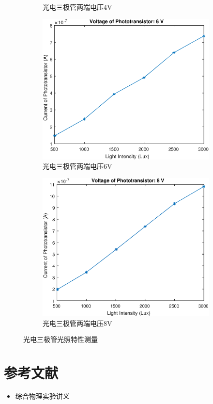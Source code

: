\documentclass{ctexart}
\begin{document}
\begin{figure}[H]
\begin{subfigure}{.45\textwidth}
    \caption{光电三极管两端电压4V}
  \end{subfigure}
  \begin{subfigure}{.45\textwidth}
    \centering
    \includegraphics[width=\linewidth]{光电传感器综合实验图像/phototransistor_6V}
    \caption{光电三极管两端电压6V}
  \end{subfigure}
  \begin{subfigure}{.45\textwidth}
    \centering
    \includegraphics[width=\linewidth]{光电传感器综合实验图像/phototransistor_8V}
    \caption{光电三极管两端电压8V}
  \end{subfigure}
  \caption{光电三极管光照特性测量}
\end{figure}

\newpage
\section{参考文献}
\begin{itemize}[leftmargin=0pt]
  \item[] 综合物理实验讲义
\end{itemize}
\end{document}
